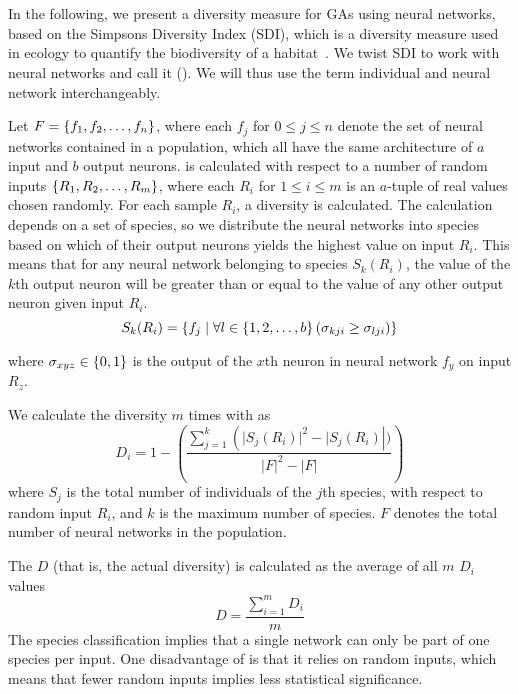 \section{\di{}}
In the following, we present a diversity measure for GAs using neural networks, based on the Simpsons Diversity Index (SDI), which is a diversity measure used in ecology to quantify the biodiversity of a habitat~\cite{simpson1949measurement}. We twist SDI to work with neural networks and call it \di{} (\dia{}). We will thus use the term individual and neural network interchangeably.

Let $F = \left\{ f_1, f_2, \dots, f_n \right\}$, where each $f_j$ for $0 \leq j \leq n$ denote the set of neural networks contained in a population, which all have the same architecture of $a$ input and $b$ output neurons. \dia{} is calculated with respect to a number of random inputs $\left\{ R_1, R_2, \dots, R_m \right\}$, where each $R_i$ for $1 \leq i \leq m$ is an $a$-tuple of real values chosen randomly. For each sample $R_i$, a diversity is calculated. The calculation depends on a set of species, so we distribute the neural networks into species based on which of their output neurons yields the highest value on input $R_i$. This means that for any neural network belonging to species $S_k(R_i)$, the value of the $k$th output neuron will be greater than or equal to the value of any other output neuron given input $R_i$.%
%
\begin{equation*}\label{eq:species}
  S_k(R_i) = \left\{ f_j \mid \forall l \in \left\{ 1, 2, \dots, b \right\} \left(\sigma_{kji} \geq \sigma_{lji}\right) \right\}
\end{equation*}
%

where $\sigma_{xyz} \in \left\{ 0, 1 \right\}$ is the output of the $x$th neuron in neural network $f_y$ on input $R_z$.

We calculate the diversity $m$ times with \dia{} as
%
\begin{equation*}\label{eq:sdi}
  D_i = 1 - \left(\frac{\sum_{j=1}^{k}\left(\lvert S_j\left(R_i\right) \rvert^2 - \lvert S_j(R_i)\right\rvert)}{\lvert F\rvert^2 - \lvert F\rvert}\right) 
\end{equation*}
%
where $S_j$ is the total number of individuals of the $j$th species, with respect to random input $R_i$, and $k$ is the maximum number of species. $F$ denotes the total number of neural networks in the population. 

The \dia{} $D$ (that is, the actual diversity) is calculated as the average of all $m$ $D_i$ values
%
\[D =\frac{\sum_{i=1}^m{D_i}}{m}\]
%
The species classification implies that a single network can only be part of one species per input. One disadvantage of \dia{} is that it relies on random inputs, which means that fewer random inputs implies less statistical significance.
